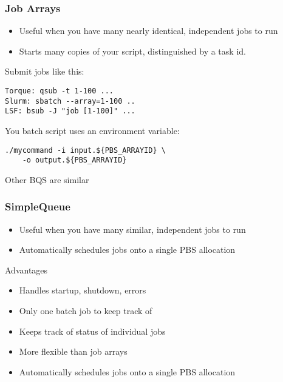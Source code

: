 \documentclass[10pt]{beamer}
\begin{document}
\begin{frame}[fragile]
\frametitle{Job Arrays}

\begin{itemize}
\item Useful when you have many nearly identical, independent jobs to run
\item Starts many copies of your script, distinguished by a task id.
\end{itemize}

Submit jobs like this:
\begin{verbatim}
Torque: qsub -t 1-100 ...
Slurm: sbatch --array=1-100 ..
LSF: bsub -J "job [1-100]" ...
\end{verbatim}

You batch script uses an environment variable:
\begin{verbatim}
./mycommand -i input.${PBS_ARRAYID} \
    -o output.${PBS_ARRAYID}
\end{verbatim}
Other BQS are similar
\end{frame}

\begin{frame}[fragile]
\frametitle{SimpleQueue}

\begin{itemize}
\item Useful when you have many similar, independent jobs to run
\item Automatically schedules jobs onto a single PBS allocation
\end{itemize}

Advantages

\begin{itemize}
\item Handles startup, shutdown, errors
\item Only one batch job to keep track of
\item Keeps track of status of individual jobs
\item More flexible than job arrays
\item Automatically schedules jobs onto a single PBS allocation
\end{itemize}

\end{frame}
\end{document}
